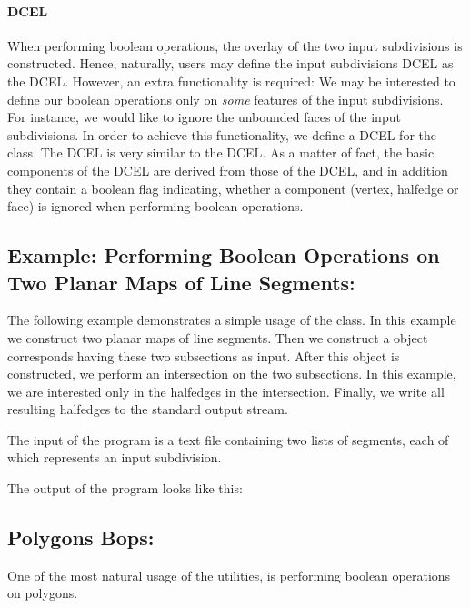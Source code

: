 \begin{ccTexOnly}
\paragraph{DCEL}
When performing boolean operations, the overlay of the two input subdivisions is 
constructed. Hence, naturally, users may define the input subdivisions DCEL as the 
 DCEL. 
However, an extra functionality is required: We may be interested 
to define our boolean operations only on {\it some} features of the input subdivisions.
For instance, we would like to ignore the unbounded faces of the input subdivisions.
In order to achieve this functionality, we define a DCEL for the 
 class. 
The  DCEL is very similar to 
the  DCEL.
As a matter of fact, the basic components 
of the  DCEL are 
derived from those of the  DCEL, 
and in addition they contain a boolean flag indicating, 
whether a component (vertex, halfedge or face) is ignored 
when performing boolean operations.

\subsection*{Example: Performing Boolean Operations on Two Planar Maps of Line Segments:}
The following example demonstrates a simple usage of the  class.
In this example we construct two planar maps of line segments. 
Then we construct a  object corresponds 
having these two subsections as input. 
After this object is constructed, we perform an intersection on the two subsections. 
In this example, we are interested only in the halfedges in the intersection.
Finally, we write all resulting halfedges to the standard output stream. 

The input of the program is a text file containing two lists of segments, 
each of which represents an input subdivision.

The output of the program looks like this:


\subsection*{Polygons Bops:}
One of the most natural usage of 
the  utilities, 
is performing boolean operations on polygons.


\end{ccTexOnly}
